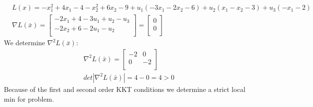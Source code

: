 \documentclass[12pt]{article}
\begin{document}
    \begin{align*}
        &L(x) = -x_1^2 + 4x_1 - 4 -x_2^2 + 6x_2 -9 + u_1 (-3x_1 -2x_2 - 6) + u_2 (x_1 -x_2 -3) + u_3 (-x_1 -2)\\
        &\nabla L(\bar x) =
        \begin{bmatrix}
            -2x_1 + 4 - 3u_1 + u_2 - u_3 \\
            -2x_2 + 6 -2u_1 - u_2\\
        \end{bmatrix} =
        \begin{bmatrix}
            0\\
            0\\
        \end{bmatrix}
    \end{align*}
    We determine $\nabla^2 L(\bar x)$:\\
    \begin{align*}
        &\nabla^2 L(\bar x) = 
        \begin{bmatrix}
            -2 & 0\\
            0 & -2\\
        \end{bmatrix}\\
        &det|\nabla^2 L(\bar x) | = 4 - 0 = 4 > 0
    \end{align*}
Because of the first and second order KKT conditions we determine a strict local min for problem. 
\end{document}
